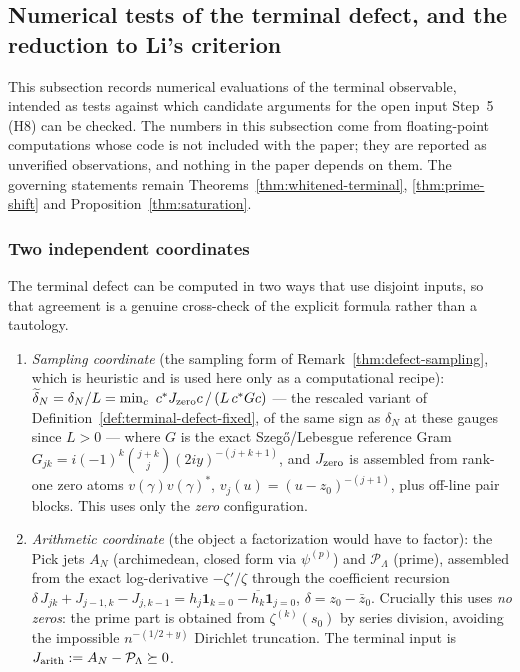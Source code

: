 \documentclass[11pt]{amsart}
\theoremstyle{definition}
\theoremstyle{remark}
\theoremstyle{definition}
\begin{document}
\subsection{Numerical tests of the terminal defect, and the reduction to Li's criterion}\label{sec:h8-harness}

This subsection records numerical evaluations of the terminal observable, intended as tests
against which candidate arguments for the open input Step~5 (H8) can be checked.  The numbers in
this subsection come from floating-point computations whose code is not included with the paper;
they are reported as unverified observations, and nothing in the paper depends on them.  The
governing statements remain Theorems~\ref{thm:whitened-terminal}, \ref{thm:prime-shift} and
Proposition~\ref{thm:saturation}.

\subsubsection*{Two independent coordinates}

The terminal defect can be computed in two ways that use disjoint inputs, so that agreement is a
genuine cross-check of the explicit formula rather than a tautology.

\begin{enumerate}[label=\textnormal{(\alph*)}]
\item \emph{Sampling coordinate} (the sampling form of Remark~\ref{thm:defect-sampling}, which is
heuristic and is used here only as a computational recipe): $\widetilde\delta_N=\delta_N/L=\min_c\ c^*J_{\rm zero}c\,/\,(L\,c^*Gc)$
--- the rescaled variant of Definition~\ref{def:terminal-defect-fixed}, of the same sign as $\delta_N$
at these gauges since $L>0$ --- where
$G$ is the exact Szeg\H{o}/Lebesgue reference Gram
$G_{jk}=i(-1)^k\binom{j+k}{j}(2iy)^{-(j+k+1)}$, and $J_{\rm zero}$ is assembled from rank-one zero
atoms $v(\gamma)v(\gamma)^*$, $v_j(u)=(u-z_0)^{-(j+1)}$, plus off-line pair blocks.  This uses only the
\emph{zero} configuration.
\item \emph{Arithmetic coordinate} (the object a factorization would have to factor): the Pick jets
$A_N$ (archimedean, closed form via $\psi^{(p)}$) and $\mathcal P_\Lambda$ (prime), assembled from the
exact log-derivative $-\zeta'/\zeta$ through the coefficient recursion
$\delta\,J_{jk}+J_{j-1,k}-J_{j,k-1}=h_j\mathbf 1_{k=0}-\overline{h_k}\mathbf 1_{j=0}$,
$\delta=z_0-\bar z_0$.  Crucially this uses \emph{no zeros}: the prime part is obtained from
$\zeta^{(k)}(s_0)$ by series division, avoiding the impossible $n^{-(1/2+y)}$ Dirichlet truncation.
The terminal input is $J_{\rm arith}:=A_N-\mathcal P_\Lambda\succeq0$.
\end{enumerate}
\end{document}
